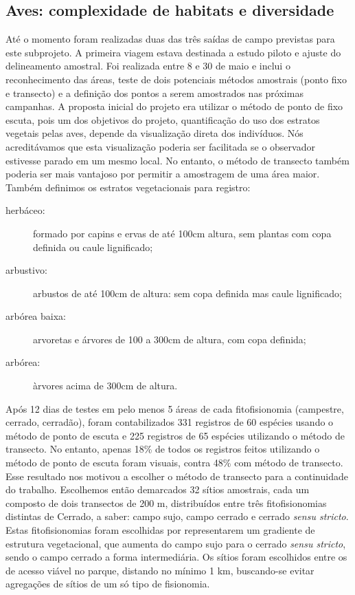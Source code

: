 \subsection{Aves: complexidade de habitats e diversidade} %
\label{sec:compl-de-habit} 

Até o momento foram realizadas duas das três saídas de campo previstas
para este subprojeto. A primeira viagem estava destinada a estudo piloto
e ajuste do delineamento amostral. Foi realizada entre 8 e 30 de
maio e inclui o reconhecimento das áreas, teste de dois
potenciais métodos amostrais (ponto fixo e transecto) e a definição dos pontos a serem
amostrados nas próximas campanhas. 
A proposta inicial do projeto era utilizar o método de ponto de
fixo escuta, pois um dos objetivos do projeto, quantificação do uso dos
estratos vegetais pelas aves, depende da visualização direta dos
indivíduos. Nós acreditávamos que esta visualização poderia ser
facilitada se o observador estivesse parado em um mesmo local. No
entanto, o método de transecto também poderia ser mais vantajoso por
permitir a amostragem de uma área maior. 
Também definimos os estratos vegetacionais para registro: 
\begin{description}
\item[herbáceo:] formado por capins e ervas de até 100cm altura, sem plantas com copa definida ou caule lignificado;
\item[arbustivo:] arbustos de até 100cm de altura: sem copa definida mas caule lignificado;
\item[arbórea baixa:] arvoretas e árvores de 100 a 300cm de altura, com copa definida;
\item[arbórea:] àrvores acima de 300cm de altura. 
\end{description}

 Após 12 dias de testes em 
pelo menos 5 áreas de cada fitofisionomia (campestre, cerrado, cerradão),
foram contabilizados 331 registros de 60 espécies usando o método de
ponto de escuta e 225 registros de 65 espécies utilizando o método de
transecto. No entanto, apenas 18\% de todos os registros feitos
utilizando o método de ponto de escuta foram visuais, contra 48\%
com  método de transecto. Esse resultado nos motivou a escolher o método de
transecto para a continuidade do trabalho.
Escolhemos então demarcados 32 sítios amostrais,
cada um composto de dois transectos de 200 m, distribuídos entre três
fitofisionomias distintas de Cerrado, a saber: campo sujo, campo
cerrado e cerrado \textit{sensu stricto}. Estas fitofisionomias foram
escolhidas por representarem um gradiente de estrutura vegetacional,
que aumenta do campo sujo para o cerrado \textit{sensu stricto}, sendo
o campo cerrado a forma intermediária. Os sítios foram escolhidos entre
os de acesso viável no parque, distando no mínimo 1 km, buscando-se
evitar agregações de sítios de um só tipo de fisionomia.

